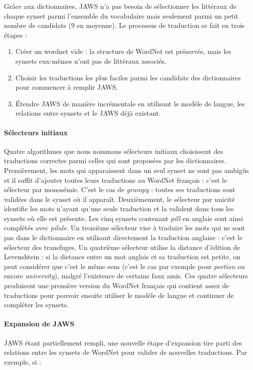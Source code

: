 Grâce aux dictionnaires, JAWS n'a pas besoin de sélectionner les littéraux de chaque synset parmi l'ensemble du vocabulaire mais seulement parmi un petit nombre de candidats (9 en moyenne). Le processus de traduction se fait en trois étapes :
\begin{enumerate}
    \item Créer un wordnet vide : la structure de WordNet est préservée, mais les synsets eux-mêmes n'ont pas de littéraux associés.
    \item Choisir les traductions les plus faciles parmi les candidats des dictionnaires pour commencer à remplir JAWS.
    \item Étendre JAWS de manière incrémentale en utilisant le modèle de langue, les relations entre synsets et le JAWS déjà existant.
\end{enumerate}

\paragraph{Sélecteurs initiaux} Quatre algorithmes que nous nommons sélecteurs initiaux choisissent des traductions correctes parmi celles qui sont proposées par les dictionnaires. Premièrement, les mots qui apparaissent dans un seul synset ne sont pas ambigüs et il suffit d'ajouter toutes leurs traductions au WordNet français : c'est le sélecteur par monosémie. C'est le cas de \textit{grumpy} : toutes ses traductions sont validées dans le synset où il apparaît. Deuxièmement, le sélecteur par unicité identifie les mots n'ayant qu'une seule traduction et la valident dans tous les synsets où elle est présente. Les cinq synsets contenant \textit{pill} en anglais sont ainsi complétés avec \textit{pilule}. Un troisième sélecteur vise à traduire les mots qui ne sont pas dans le dictionnaire en utilisant directement la traduction anglaise : c'est le sélecteur des transfuges. Un quatrième sélecteur utilise la distance d'édition de Levenshtein : si la distance entre un mot anglais et sa traduction est petite, on peut considérer que c'est le même sens (c'est le cas par exemple pour \textit{portion} ou encore \textit{university}), malgré l'existence de certains faux amis. Ces quatre sélecteurs produisent une première version du WordNet français qui contient assez de traductions pour pouvoir ensuite utiliser le modèle de langue et continuer de compléter les synsets.

\paragraph{Expansion de JAWS} JAWS étant partiellement rempli, une nouvelle étape d'expansion tire parti des relations entre les synsets de WordNet pour valider de nouvelles traductions. Par exemple, si :

